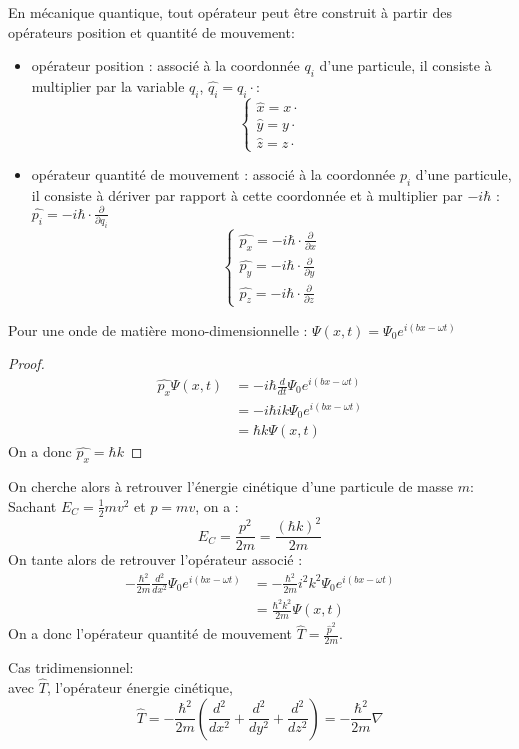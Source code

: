 \documentclass[../main.tex]{subfile}
\begin{document}
	En mécanique quantique, tout opérateur peut être construit à partir des opérateurs position et quantité de mouvement:
\begin{itemize}
	\item opérateur position : associé à la coordonnée $q_i$ d'une particule, il consiste à multiplier par la variable $q_i$, $\hat{q_i} = q_i \cdot$:
	$$
	\left\{
\begin{array}{l}
	\hat{x} = x \cdot \\
	\hat{y} = y \cdot \\
	\hat{z} = z \cdot 
\end{array}
	\right .
	$$
	\item opérateur quantité de mouvement : associé à la coordonnée $p_i$ d'une particule, il consiste à dériver par rapport à cette coordonnée et à multiplier par $-i\hbar$ : $\hat{p_i} = -i\hbar \cdot \frac{\partial}{\partial q_i}$
	$$
	\left\{
\begin{array}{l}
	\hat{p_x} = -i\hbar \cdot \frac{\partial}{\partial x}\\
	\hat{p_y} = -i\hbar \cdot \frac{\partial}{\partial y}\\
	\hat{p_z} = -i\hbar \cdot \frac{\partial}{\partial z}
\end{array}
	\right.
	$$
\end{itemize}

\begin{ex}
	Pour une onde de matière mono-dimensionnelle : $\Psi (x, t) = \Psi_0 e^{i(bx - \omega t)}$
\begin{proof}	
	$$
\begin{aligned}
	\hat{p_x} \Psi (x, t) &= - i \hbar \frac{d}{dt} \Psi_0 e^{i(bx - \omega t)}\\
	&= -i \hbar i k \Psi_0 e^{i(bx - \omega t)}\\
	&= \hbar k \Psi (x, t)
\end{aligned}
	$$
	On a donc $\hat{p_x} = \hbar k$
\end{proof}
	On cherche alors à retrouver l'énergie cinétique d'une particule de masse $m$:\\
	Sachant $E_C = \frac{1}{2} m v^2$ et $p = mv$, on a :
	$$E_C = \frac{p^2}{2m} = \frac{(\hbar k)^2}{2m}$$
	On tante alors de retrouver l'opérateur associé :\\
	$$
\begin{aligned}
	-\frac{\hbar^2}{2m} \frac{d^2}{dx^2} \Psi_0 e^{i(bx - \omega t)} &= -\frac{\hbar^2}{2m} i^2k^2 \Psi_0e^{i(bx - \omega t)}\\
	&= \frac{\hbar^2k^2}{2m} \Psi (x, t)
\end{aligned}
	$$
	On a donc l'opérateur quantité de mouvement $\hat{T} = \frac{\hat{p}^2}{2m}$.
\end{ex}
Cas tridimensionnel:\\
avec $\hat{T}$, l'opérateur énergie cinétique, 
$$\hat{T} = -\frac{\hbar^2}{2m} (\frac{d^2}{dx^2} + \frac{d^2}{dy^2} + \frac{d^2}{dz^2}) = -\frac{\hbar^2}{2m}\nabla$$
\end{document}

